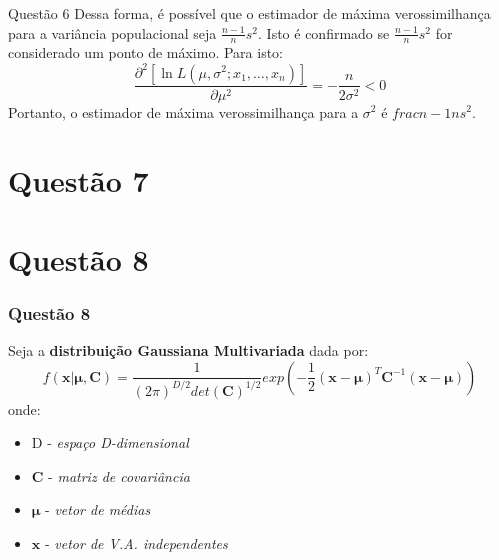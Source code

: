 \documentclass{beamer}\usepackage[]{graphicx}\usepackage[]{color}
\begin{document}
		\begin{frame}{Questão 6}
			Dessa forma, é possível que o estimador de máxima verossimilhança para a variância populacional seja $ \frac{n-1}{n}s^{2}$.  Isto é confirmado se $ \frac{n-1}{n}s^{2}$ for considerado um ponto de máximo.  Para isto:
			$$\frac{\partial^{2}[ \ln   L(\mu,\sigma^{2};x_{1},\dots,x_{n})]}{\partial \mu^{2}}  = -\frac{n}{2\sigma^2} < 0 $$
			Portanto, o estimador de máxima verossimilhança para a $\sigma^{2}$ é $frac{n-1}{n}s^{2}$.
		\end{frame}
	\section{Questão 7}
	\section{Questão 8}
		\begin{frame}
			\frametitle{Questão 8}
			Seja a \textbf{distribuição Gaussiana Multivariada} dada por:$$f(\boldsymbol{x} \lvert \boldsymbol{\mu, C}) = \frac{1}{(2\pi)^{D/2}det(\boldsymbol{C})^{1/2}}exp(-\frac{1}{2}(\boldsymbol{x} - \boldsymbol{\mu})^{T}\boldsymbol{C}^{-1}(\boldsymbol{x} - \boldsymbol{\mu}))$$
			onde:
			\begin{itemize}
				\item D - \textit{espaço D-dimensional}
				\item \textbf{C} - \textit{matriz de covariância}
				\item $\boldsymbol{\mu}$ - \textit{vetor de médias}
				\item $\boldsymbol{x}$ - \textit{vetor de V.A. independentes}
			\end{itemize}
		\end{frame}
		
\end{document}
